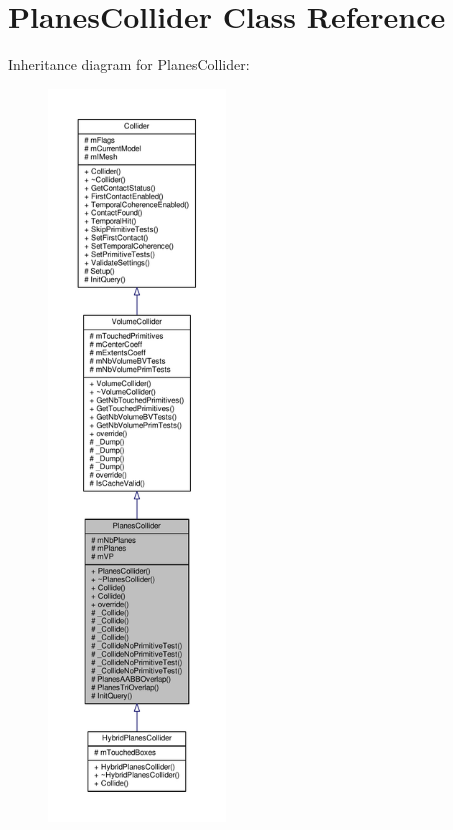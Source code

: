 \hypertarget{classPlanesCollider}{}\section{Planes\+Collider Class Reference}
\label{classPlanesCollider}


Inheritance diagram for Planes\+Collider\+:
\nopagebreak
\begin{figure}[H]
\begin{center}
\leavevmode
\includegraphics[height=550pt]{de/dc3/classPlanesCollider__inherit__graph}
\end{center}
\end{figure}


